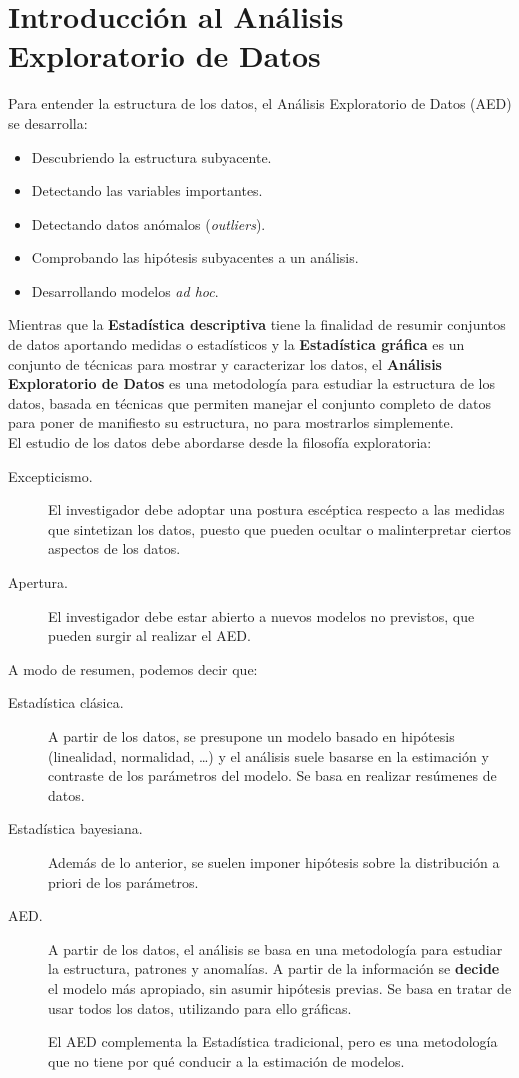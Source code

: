 \chapter{Introducción al Análisis Exploratorio de Datos}
\noindent
Para entender la estructura de los datos, el Análisis Exploratorio de Datos (AED) se desarrolla:
\begin{itemize}
    \item Descubriendo la estructura subyacente.
    \item Detectando las variables importantes.
    \item Detectando datos anómalos (\textit{outliers}).
    \item Comprobando las hipótesis subyacentes a un análisis.
    \item Desarrollando modelos \textit{ad hoc}.
\end{itemize}

\noindent
Mientras que la \textbf{Estadística descriptiva} tiene la finalidad de resumir conjuntos de datos aportando medidas o estadísticos y la \textbf{Estadística gráfica} es un conjunto de técnicas para mostrar y caracterizar los datos, el \textbf{Análisis Exploratorio de Datos} es una metodología para estudiar la estructura de los datos, basada en técnicas que permiten manejar el conjunto completo de datos para poner de manifiesto su estructura, no para mostrarlos simplemente.\\ 

\noindent
El estudio de los datos debe abordarse desde la filosofía exploratoria:
\begin{description}
    \item [Excepticismo.] El investigador debe adoptar una postura escéptica respecto a las medidas que sintetizan los datos, puesto que pueden ocultar o malinterpretar ciertos aspectos de los datos.
    \item [Apertura.] El investigador debe estar abierto a nuevos modelos no previstos, que pueden surgir al realizar el AED.
\end{description}

\noindent
A modo de resumen, podemos decir que:
\begin{description}
    \item [Estadística clásica.] A partir de los datos, se presupone un modelo basado en hipótesis (linealidad, normalidad, \ldots) y el análisis suele basarse en la estimación y contraste de los parámetros del modelo. Se basa en realizar resúmenes de datos.
    \item [Estadística bayesiana.] Además de lo anterior, se suelen imponer hipótesis sobre la distribución a priori de los parámetros.
    \item [AED.]  A partir de los datos, el análisis se basa en una metodología para estudiar la estructura, patrones y anomalías. A partir de la información se \textbf{decide} el modelo más apropiado, sin asumir hipótesis previas. Se basa en tratar de usar todos los datos, utilizando para ello gráficas.

        El AED complementa la Estadística tradicional, pero es una metodología que no tiene por qué conducir a la estimación de modelos.
\end{description}

